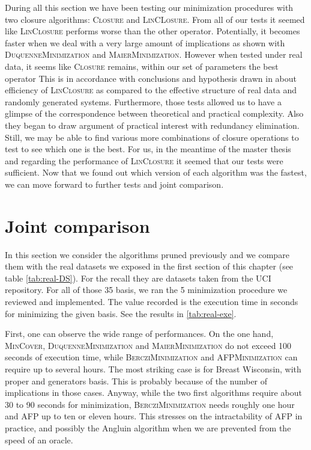 During all this section we have been testing our minimization procedures with two closure algorithms: \textsc{Closure} and \textsc{LinCLosure}. From all of
our tests it seemed like \textsc{LinClosure} performs worse than the 
other operator. Potentially, it becomes faster when we deal with a very large amount of implications as shown with \textsc{DuquenneMinimization} and \textsc{MaierMinimization}. However when tested under real data, it seems like \textsc{Closure} remains, within our set of parameters the best operator This is in accordance with conclusions and hypothesis drawn in
\cite{bazhanov_optimizations_2014} about efficiency of \textsc{LinClosure} as compared to the effective structure of real data and randomly generated systems. Furthermore, those tests allowed us to have a glimpse of the correspondence between theoretical and practical complexity. Also they began to draw argument of practical interest with redundancy elimination. Still, we may be able to find various more combinations of closure operations to test to see which one is the best. For us, in the meantime of the master thesis and regarding the performance of \textsc{LinClosure} it seemed that our tests were sufficient. Now that we found out which version of each algorithm was the fastest, we can move forward to further tests and joint comparison.

\begin{figure}[H]
	
\end{figure}


\section{Joint comparison}

In this section we consider the algorithms pruned previously and we compare them
with the real datasets we exposed in the first section of this chapter (see table \ref{tab:real-DS}). For the recall they are datasets taken from the UCI 
repository. For all of those 35 basis, we ran the 5 minimization procedure
we reviewed and implemented. The value recorded is the execution time in seconds
for minimizing the given basis. See the results in \ref{tab:real-exe}.

\vspace{1.2em}

First, one can observe the wide range of performances. On the one hand,
\textsc{MinCover}, \textsc{DuquenneMinimization}  and \textsc{MaierMinimization} do not exceed 100 seconds of execution time, while \textsc{BercziMinimization} and \textsc{AFPMinimization} can require up to several hours. The most striking case is for Breast Wisconsin, with proper and generators basis. This is probably because of the number of implications in those cases. Anyway, while the two first algorithms require about 30 to 90 seconds for minimization, \textsc{BercziMinimization} needs roughly one hour and \textsc{AFP} up to ten or eleven hours. This stresses on the intractability of \textsc{AFP} in practice, and possibly the Angluin algorithm when we are prevented from the speed of an oracle.

